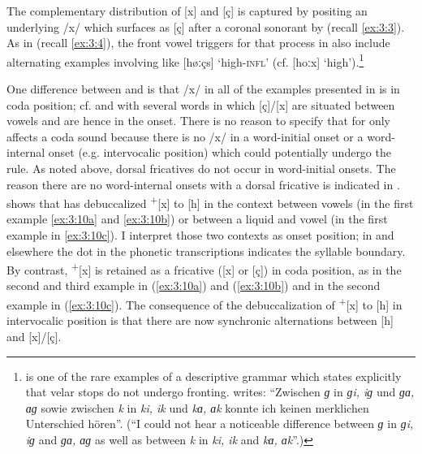 The complementary distribution of [x] and [ç] is captured by positing an underlying /x/ which surfaces as [ç] after a coronal sonorant by  (recall \ref{ex:3:3}). As in  (recall \ref{ex:3:4}), the front vowel triggers for that process in  also include alternating examples involving  like [høːçs] ‘high-\textsc{infl}’ (cf. [hoːx] ‘high’).\footnote{{\citet{Meinherz1920} is one of the rare examples of a descriptive grammar which states explicitly that velar stops do not undergo fronting. \citet[25]{Meinherz1920} writes: “Zwischen} {\textit{ɡ}} {in} {\textit{ɡi, iɡ}} {und} {\textit{ɡɑ, ɑɡ}} {sowie zwischen} {\textit{k}} {in} {\textit{ki, ik}} {und} {\textit{kɑ, ɑk}} {konnte ich keinen merklichen Unterschied hören”. (“I could not hear a noticeable difference between} {\textit{ɡ}} {in} {\textit{ɡi, iɡ}} {and} {\textit{ɡɑ, ɑɡ}} {as well as between} {\textit{k}} {in} {\textit{ki, ik}} {and} {\textit{kɑ, ɑk}}{”.)} }

One difference between  and  is that /x/ in all of the examples presented in  is in coda position; cf.  and  with several words in which [ç]/[x] are situated between vowels and are hence in the onset. There is no reason to specify that  for  only affects a coda sound because there is no /x/ in a word-initial onset or a word-internal onset (e.g. intervocalic position) which could potentially undergo the rule. As noted above, dorsal fricatives do not occur in word-initial onsets. The reason there are no word-internal onsets with a dorsal fricative is indicated in . \citet[26]{Meinherz1920} shows that  has debuccalized  \textsuperscript{+}[x] to [h] in the context between vowels (in the first example \ref{ex:3:10a} and \ref{ex:3:10b}) or between a liquid and vowel (in the first example in \ref{ex:3:10c}). I interpret those two contexts as onset position; in  and elsewhere the dot in the phonetic transcriptions indicates the syllable boundary. By contrast,  \textsuperscript{+}[x] is retained as a fricative ([x] or [ç]) in coda position, as in the second and third example in (\ref{ex:3:10a}) and (\ref{ex:3:10b}) and in the second example in (\ref{ex:3:10c}). The consequence of the debuccalization of  \textsuperscript{+}[x] to [h] in intervocalic position is that there are now synchronic alternations between [h] and [x]/[ç].


